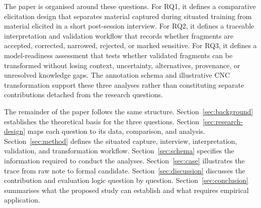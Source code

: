 The paper is organised around these questions. For RQ1, it defines a comparative elicitation design that separates material captured during situated training from material elicited in a short post-session interview. For RQ2, it defines a traceable interpretation and validation workflow that records whether fragments are accepted, corrected, narrowed, rejected, or marked sensitive. For RQ3, it defines a model-readiness assessment that tests whether validated fragments can be transformed without losing context, uncertainty, alternatives, provenance, or unresolved knowledge gaps. The annotation schema and illustrative CNC transformation support these three analyses rather than constituting separate contributions detached from the research questions.

The remainder of the paper follows the same structure. Section~\ref{sec:background} establishes the theoretical basis for the three questions. Section~\ref{sec:research-design} maps each question to its data, comparison, and analysis. Section~\ref{sec:method} defines the situated capture, interview, interpretation, validation, and transformation workflow. Section~\ref{sec:schema} specifies the information required to conduct the analyses. Section~\ref{sec:case} illustrates the trace from raw note to formal candidate. Section~\ref{sec:discussion} discusses the contribution and evaluation logic question by question. Section~\ref{sec:conclusion} summarises what the proposed study can establish and what requires empirical application.
